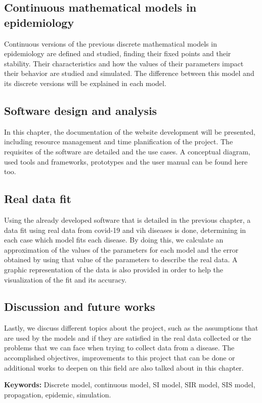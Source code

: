 \subsection*{Continuous mathematical models in epidemiology}

Continuous versions of the previous discrete mathematical models in epidemiology are defined and studied, finding their fixed points and their stability. Their characteristics and how the values of their parameters impact their behavior are studied and simulated. The difference between this model and its discrete versions will be explained in each model.

\subsection*{Software design and analysis}

In this chapter, the documentation of the website development will be presented, including resource management and time planification of the project. The requisites of the software are detailed and the use cases. A conceptual diagram, used tools and frameworks, prototypes and the user manual can be found here too.

\subsection*{Real data fit}

Using the already developed software that is detailed in the previous chapter, a data fit using real data from covid-19 and vih diseases is done, determining in each case which model fits each disease. By doing this, we calculate an approximation of the values of the parameters for each model and the error obtained by using that value of the parameters to describe the real data. A graphic representation of the data is also provided in order to help the visualization of the fit and its accuracy.

\subsection*{Discussion and future works}

Lastly, we discuss different topics about the project, such as the assumptions that are used by the models and if they are satisfied in the real data collected or the problems that we can face when trying to collect data from a disease. The accomplished objectives, improvements to this project that can be done or additional works to deepen on this field are also talked about in this chapter.

\textbf{Keywords: } Discrete model, continuous model, SI model, SIR model, SIS model, propagation, epidemic, simulation.
